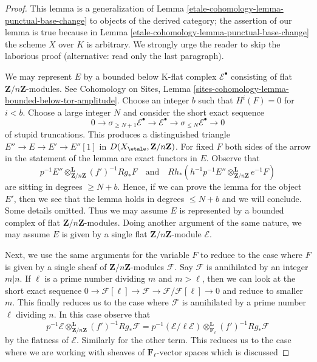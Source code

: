 \begin{proof}
This lemma is a generalization of Lemma \ref{etale-cohomology-lemma-punctual-base-change}
to objects of the derived category; the assertion of our lemma is true because
in Lemma \ref{etale-cohomology-lemma-punctual-base-change} the scheme $X$ over $K$
is arbitrary. We strongly urge the reader to skip the laborious proof
(alternative: read only the last paragraph).

\medskip\noindent
We may represent $E$ by a bounded below K-flat complex
$\mathcal{E}^\bullet$ consisting of flat $\mathbf{Z}/n\mathbf{Z}$-modules.
See Cohomology on Sites, Lemma
\ref{sites-cohomology-lemma-bounded-below-tor-amplitude}.
Choose an integer $b$ such that $H^i(F) = 0$ for $i < b$.
Choose a large integer $N$ and consider the short exact sequence
$$
0 \to \sigma_{\geq N + 1}\mathcal{E}^\bullet \to
\mathcal{E}^\bullet \to
\sigma_{\leq N}\mathcal{E}^\bullet \to 0
$$
of stupid truncations. This produces a distinguished triangle
$E'' \to E \to E' \to E''[1]$ in $D(X_\etale, \mathbf{Z}/n\mathbf{Z})$.
For fixed $F$ both sides of the arrow
in the statement of the lemma are exact functors in $E$. Observe that
$$
p^{-1}E'' \otimes_{\mathbf{Z}/n\mathbf{Z}}^\mathbf{L} (f')^{-1}Rg_*F
\quad\text{and}\quad
Rh_*(h^{-1}p^{-1}E'' \otimes_{\mathbf{Z}/n\mathbf{Z}}^\mathbf{L} e^{-1}F)
$$
are sitting in degrees $\geq N + b$. Hence, if we can prove the lemma
for the object $E'$, then we see that the lemma holds in degrees
$\leq N + b$ and we will conclude. Some details omitted.
Thus we may assume $E$ is represented
by a bounded complex of flat $\mathbf{Z}/n\mathbf{Z}$-modules.
Doing another argument of the same nature, we may assume
$E$ is given by a single flat $\mathbf{Z}/n\mathbf{Z}$-module
$\mathcal{E}$.

\medskip\noindent
Next, we use the same arguments for the variable $F$
to reduce to the case where $F$ is given by a single
sheaf of $\mathbf{Z}/n\mathbf{Z}$-modules $\mathcal{F}$.
Say $\mathcal{F}$ is annihilated by an integer $m | n$.
If $\ell$ is a prime number dividing $m$ and $m > \ell$,
then we can look at the short exact sequence
$0 \to \mathcal{F}[\ell] \to \mathcal{F} \to
\mathcal{F}/\mathcal{F}[\ell] \to 0$
and reduce to smaller $m$. This finally reduces us to
the case where $\mathcal{F}$ is annihilated by a prime
number $\ell$ dividing $n$.
In this case observe that
$$
p^{-1}\mathcal{E}
\otimes_{\mathbf{Z}/n\mathbf{Z}}^\mathbf{L}
(f')^{-1}Rg_*\mathcal{F}
=
p^{-1}(\mathcal{E}/\ell \mathcal{E})
\otimes_{\mathbf{F}_\ell}^\mathbf{L}
(f')^{-1}Rg_*\mathcal{F}
$$
by the flatness of $\mathcal{E}$. Similarly for the other term.
This reduces us to the case where we are working with sheaves
of $\mathbf{F}_\ell$-vector spaces which is discussed


\end{proof}
